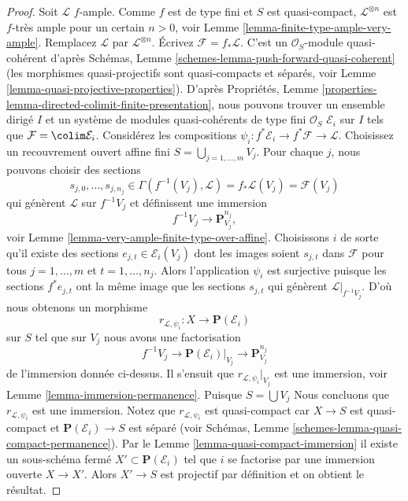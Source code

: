 \begin{proof}
Soit $\mathcal{L}$ $f$-ample. Comme $f$ est de
type fini et $S$ est quasi-compact, $\mathcal{L}^{\otimes n}$ est $f$-très
ample pour un certain $n > 0$,
voir Lemme \ref{lemma-finite-type-ample-very-ample}. Remplacez $\mathcal{L}$
par $\mathcal{L}^{\otimes n}$. Écrivez $\mathcal{F} = f_*\mathcal{L}$. C'est un
$\mathcal{O}_S$-module quasi-cohérent
d'après Schémas, Lemme \ref{schemes-lemma-push-forward-quasi-coherent} (les
morphismes quasi-projectifs sont quasi-compacts
et séparés, voir Lemme \ref{lemma-quasi-projective-properties}). D'après Propriétés,
Lemme \ref{properties-lemma-directed-colimit-finite-presentation}, nous pouvons trouver un ensemble dirigé
$I$ et un système de modules
quasi-cohérents de type fini $\mathcal{O}_S$ $\mathcal{E}_i$
sur $I$ tels que $\mathcal{F} = \colim \mathcal{E}_i$. Considérez
les compositions
$\psi_i : f^*\mathcal{E}_i \to f^*\mathcal{F} \to \mathcal{L}$. Choisissez un recouvrement ouvert
affine fini $S = \bigcup_{j = 1, \ldots, m} V_j$. Pour chaque $j$, nous pouvons
choisir des sections
$$
s_{j, 0}, \ldots, s_{j, n_j} \in
\Gamma(f^{-1}(V_j), \mathcal{L}) = f_*\mathcal{L}(V_j) = \mathcal{F}(V_j)
$$
qui génèrent $\mathcal{L}$ sur $f^{-1}V_j$ et définissent une immersion
$$
f^{-1}V_j \longrightarrow \mathbf{P}^{n_j}_{V_j},
$$
voir Lemme \ref{lemma-very-ample-finite-type-over-affine}. Choisissons $i$ de sorte
qu'il existe des sections $e_{j, t} \in \mathcal{E}_i(V_j)$ dont les images soient $s_{j, t}$
dans $\mathcal{F}$ pour tous $j = 1, \ldots, m$ et $t = 1, \ldots, n_j$. Alors
l'application $\psi_i$ est surjective puisque les
sections $f^*e_{j, t}$ ont la même image que les sections $s_{j, t}$
qui génèrent $\mathcal{L}|_{f^{-1}V_j}$. D'où nous obtenons un morphisme
$$
r_{\mathcal{L}, \psi_i} : X \longrightarrow \mathbf{P}(\mathcal{E}_i)
$$
sur $S$ tel que sur $V_j$ nous avons une factorisation
$$
f^{-1}V_j \to \mathbf{P}(\mathcal{E}_i)|_{V_j} \to \mathbf{P}^{n_j}_{V_j}
$$
de l'immersion donnée ci-dessus. Il s'ensuit que $r_{\mathcal{L}, \psi_i}|_{V_j}$ est
une immersion, voir Lemme \ref{lemma-immersion-permanence}. Puisque
$S = \bigcup V_j$ Nous concluons que $r_{\mathcal{L}, \psi_i}$ est une
immersion.
Notez que $r_{\mathcal{L}, \psi_i}$ est quasi-compact car
$X \to S$ est quasi-compact et $\mathbf{P}(\mathcal{E}_i) \to S$ est séparé (voir
Schémas, Lemme \ref{schemes-lemma-quasi-compact-permanence}). Par le Lemme \ref{lemma-quasi-compact-immersion}
il existe un sous-schéma fermé $X' \subset \mathbf{P}(\mathcal{E}_i)$ tel que $i$
se factorise par une immersion ouverte $X \to X'$.
Alors $X' \to S$ est projectif par définition
et on obtient le résultat.
\end{proof}

